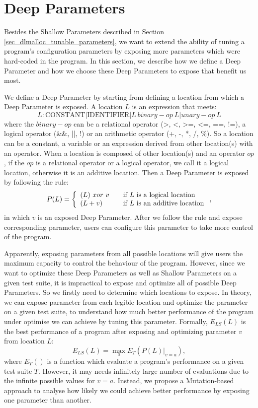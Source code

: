\section{Deep Parameters}
Besides the Shallow Parameters described in Section \ref{sec_dlmalloc_tunable_parameters}, we want to extend the ability of tuning a program's configuration parameters by exposing more parameters which were hard-coded in the program. In this section, we describe how we define a Deep Parameter and how we choose these Deep Parameters to expose that benefit us most. 

We define a Deep Parameter by starting from defining a location from which a Deep Parameter is exposed. A location $L$ is an expression that meets:
\begin{equation}
L: \mbox{CONSTANT} | \mbox{IDENTIFIER} | L\ binary-op\ L | unary-op\ L
\end{equation}
where the $binary-op$ can be a relational operator (>, <, >=, <=, ==, !=), a logical operator (\&\&, ||, !) or an arithmetic operator (+, -, *, /, \%). So a location can be a constant, a variable or an expression derived from other location(s) with an operator. When a location is composed of other location(s) and an operator $op$, if the $op$ is a relational operator or a logical operator, we call it a logical location, otherwise it is an additive location. Then a Deep Parameter is exposed by following the rule:
\begin{equation}
 P(L) = \left\{
  \begin{array}{l l}
    (L) \ xor \ v & \quad \text{if $L$ is a logical location}\\
    (L + v) & \quad \text{if $L$ is an additive location}
  \end{array} \right.,
\end{equation}
in which $v$ is an exposed Deep Parameter. After we follow the rule and expose corresponding parameter, users can configure this parameter to take more control of the program.

Apparently, exposing parameters from all possible locations will give users the maximum capacity to control the behaviour of the program. However, since we want to optimize these Deep Parameters as well as Shallow Parameters on a given test suite, it is impractical to expose and optimize all of possible Deep Parameters. So we firstly need to determine which locations to expose. In theory, we can expose parameter from each legible location and optimize the parameter on a given test suite, to understand how much better performance of the program under optimise we can achieve by tuning this parameter. Formally, $E_{LS}(L)$ is the best performance of a program after exposing and optimizing parameter $v$ from location $L$:
\begin{equation}
E_{LS}(L)=\max_{a} E_T(P(L)|_{v=a}),
\end{equation}
where $E_T()$ is a function which evaluate a program's performance on a given test suite $T$. However, it may needs infinitely large number of evaluations due to the infinite possible values for $v=a$. Instead, we propose a Mutation-based approach to analyse how likely we could achieve better performance by exposing one parameter than another.

